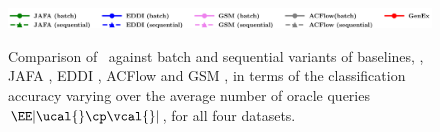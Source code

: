 \documentclass[letterpaper]{article}
\renewcommand{\cite}{\citep}
\begin{document}
\begin{figure}[!h]
    \centering
    \includegraphics[width=0.8\linewidth]{FIG/legend_full.pdf}\\
 \hspace{0.5mm}
\hspace{0.5mm}
\hspace{0.5mm}
\caption{Comparison  of \our\ against batch and sequential variants of baselines, \ie, JAFA \cite{jafa}, EDDI \cite{eddi}, ACFlow \cite{acflow} and GSM \cite{gsm}, in terms of the classification accuracy varying over the average number of oracle queries $\EE|\ucal{} \cp \vcal{}|$, for all four datasets.}%
\label{fig:main_full}
\end{figure}
\end{document}
